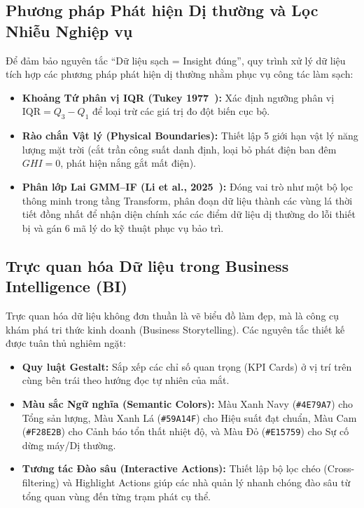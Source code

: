 \subsection{Phương pháp Phát hiện Dị thường và Lọc Nhiễu Nghiệp vụ}
Để đảm bảo nguyên tắc ``Dữ liệu sạch = Insight đúng'', quy trình xử lý dữ liệu tích hợp các phương pháp phát hiện dị thường nhằm phục vụ công tác làm sạch:
\begin{itemize}[noitemsep]
    \item \textbf{Khoảng Tứ phân vị IQR (Tukey 1977~\cite{tukey1977eda}):} Xác định ngưỡng phân vị $\text{IQR} = Q_3 - Q_1$ để loại trừ các giá trị đo đột biến cục bộ.
    \item \textbf{Rào chắn Vật lý (Physical Boundaries):} Thiết lập 5 giới hạn vật lý năng lượng mặt trời (cắt trần công suất danh định, loại bỏ phát điện ban đêm $GHI=0$, phát hiện nắng gắt mất điện).
    \item \textbf{Phân lớp Lai GMM--IF (Li et al., 2025~\cite{li2025gmmif}):} Đóng vai trò như một bộ lọc thông minh trong tầng Transform, phân đoạn dữ liệu thành các vùng lá thời tiết đồng nhất để nhận diện chính xác các điểm dữ liệu dị thường do lỗi thiết bị và gán 6 mã lý do kỹ thuật phục vụ bảo trì.
\end{itemize}

\subsection{Trực quan hóa Dữ liệu trong Business Intelligence (BI)}
Trực quan hóa dữ liệu không đơn thuần là vẽ biểu đồ làm đẹp, mà là công cụ khám phá tri thức kinh doanh (Business Storytelling). Các nguyên tắc thiết kế được tuân thủ nghiêm ngặt:
\begin{itemize}[noitemsep]
    \item \textbf{Quy luật Gestalt:} Sắp xếp các chỉ số quan trọng (KPI Cards) ở vị trí trên cùng bên trái theo hướng đọc tự nhiên của mắt.
    \item \textbf{Màu sắc Ngữ nghĩa (Semantic Colors):} Màu Xanh Navy (\texttt{\#4E79A7}) cho Tổng sản lượng, Màu Xanh Lá (\texttt{\#59A14F}) cho Hiệu suất đạt chuẩn, Màu Cam (\texttt{\#F28E2B}) cho Cảnh báo tổn thất nhiệt độ, và Màu Đỏ (\texttt{\#E15759}) cho Sự cố dừng máy/Dị thường.
    \item \textbf{Tương tác Đào sâu (Interactive Actions):} Thiết lập bộ lọc chéo (Cross-filtering) và Highlight Actions giúp các nhà quản lý nhanh chóng đào sâu từ tổng quan vùng đến từng trạm phát cụ thể.
\end{itemize}


